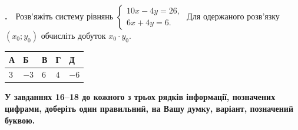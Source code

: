 \documentclass[12pt]{article}
\newlength{\nmtcellw}
\newcommand{\nmtSetCell}{\setlength{\nmtcellw}{\dimexpr(\linewidth-10\tabcolsep-6\arrayrulewidth)/5\relax}}
\newcommand{\answerTable}[5]{%
\par\nopagebreak\vspace{0.15cm}
\noindent\nmtSetCell
\begin{tabular}{|*{5}{>{\centering\arraybackslash}m{\nmtcellw}|}}
\hline
\rule[-0.15cm]{0pt}{0.6cm}\textbf{А} & \rule[-0.15cm]{0pt}{0.6cm}\textbf{Б} & \rule[-0.15cm]{0pt}{0.6cm}\textbf{В} & \rule[-0.15cm]{0pt}{0.6cm}\textbf{Г} & \rule[-0.15cm]{0pt}{0.6cm}\textbf{Д} \\
\hline
\rule[-0.2cm]{0pt}{0.75cm}#1 & \rule[-0.2cm]{0pt}{0.75cm}#2 & \rule[-0.2cm]{0pt}{0.75cm}#3 & \rule[-0.2cm]{0pt}{0.75cm}#4 & \rule[-0.2cm]{0pt}{0.75cm}#5 \\
\hline
\end{tabular}
\par\vspace{0.25cm}
}
\newcommand{\instructionBox}[1]{%
\par\vspace{0.3cm}
\begin{tcolorbox}[colback=instrBg, colframe=instrBorder, boxrule=0.6pt, arc=2pt,
    left=8pt, right=8pt, top=4pt, bottom=4pt]
\centering\small\bfseries #1
\end{tcolorbox}
\par\vspace{0.15cm}
}
\newcommand{\matchingGrid}{%
    \sbox{\nmtgridbox}{\matchingGridRaw}%
    \ifdim\wd\nmtgridbox>\linewidth \resizebox{\linewidth}{!}{\usebox{\nmtgridbox}}\else\usebox{\nmtgridbox}\fi}
\newcommand{\matchingGridRaw}{%
    \begingroup
    \renewcommand{\arraystretch}{1.15}
    \setlength{\tabcolsep}{4pt}
    \footnotesize
    \begin{tabular}{r|c|c|c|c|c|}
         \multicolumn{1}{c}{} & \multicolumn{1}{c}{\textbf{А}} & \multicolumn{1}{c}{\textbf{Б}} & \multicolumn{1}{c}{\textbf{В}} & \multicolumn{1}{c}{\textbf{Г}} & \multicolumn{1}{c}{\textbf{Д}} \\ \cline{2-6}
         \textbf{1} & \phantom{X} & \phantom{X} & \phantom{X} & \phantom{X} & \phantom{X} \\ \cline{2-6}
         \textbf{2} & & & & & \\ \cline{2-6}
         \textbf{3} & & & & & \\ \cline{2-6}
    \end{tabular}
    \endgroup
}
\newcounter{zad}
\newcommand{\zadtask}[1]{\stepcounter{zad}\noindent\textbf{\thezad.}\ \ #1\par\nopagebreak\vspace{0.2cm}}
\newcounter{ans}
\renewcommand{\instructionBox}[1]{%
\par\vspace{0.3cm}\noindent
\begin{tcolorbox}[nobeforeafter, width=\linewidth, colback=instrBg, colframe=instrBorder, boxrule=0.6pt, arc=2pt,
    left=8pt, right=8pt, top=4pt, bottom=4pt]
\centering\small\bfseries #1
\end{tcolorbox}
\par\nopagebreak\vspace{0.15cm}\nopagebreak
}
\begin{document}
\begin{samepage}
\zadtask{Розв'яжіть систему рівнянь $\begin{cases} 10x - 4y = 26, \\ 6x + 4y = 6. \end{cases}$ Для одержаного розв'язку $(x_0; y_0)$ обчисліть добуток $x_0 \cdot y_0$.}
\answerTable{$3$}{$-3$}{$6$}{$4$}{$-6$}
\par{}
\end{samepage}
\endgroup

\instructionBox{У завданнях 16--18 до кожного з трьох рядків інформації, позначених цифрами, доберіть один правильний, на Вашу думку, варіант, позначений буквою.}

\begingroup
\providecommand{\trigStyle}[1]{#1}
\providecommand{\answerTableSmall}[5]{%
\begingroup\setlength{\tabcolsep}{2pt}\small\nmtSetCell
\begin{tabular}{|*{5}{>{\centering\arraybackslash}m{\nmtcellw}|}}
\hline
\rule[-0.2cm]{0pt}{0.6cm}\textbf{А} & \textbf{Б} & \textbf{В} & \textbf{Г} & \textbf{Д} \\
\hline
\rule[-0.4cm]{0pt}{0.9cm}#1 & \rule[-0.4cm]{0pt}{0.9cm}#2 & \rule[-0.4cm]{0pt}{0.9cm}#3 & \rule[-0.4cm]{0pt}{0.9cm}#4 & \rule[-0.4cm]{0pt}{0.9cm}#5 \\
\hline
\end{tabular}\endgroup}
\providecommand{\matchingLayout}[3]{%
    \noindent
    \begin{minipage}[t]{0.36\textwidth}\vspace{0pt}\raggedright
        #1
    \end{minipage}%
    \hfill
    \begin{minipage}[t]{0.43\textwidth}\vspace{0pt}\raggedright
        #2
    \end{minipage}%
    \hfill
    \begin{minipage}[t]{0.19\textwidth}
        \vspace{0pt}
        \begin{flushright}
        #3
        \end{flushright}
    \end{minipage}}
\providecommand{\matchingLayoutBottom}[2]{%
    \noindent
    \begin{minipage}[t]{0.48\textwidth}\vspace{0pt}\raggedright
        #1
    \end{minipage}%
    \hfill
    \begin{minipage}[t]{0.48\textwidth}\vspace{0pt}\raggedright
        #2
    \end{minipage}
    \vspace{0.5cm}
    \noindent
    \matchingGrid}
\end{document}
